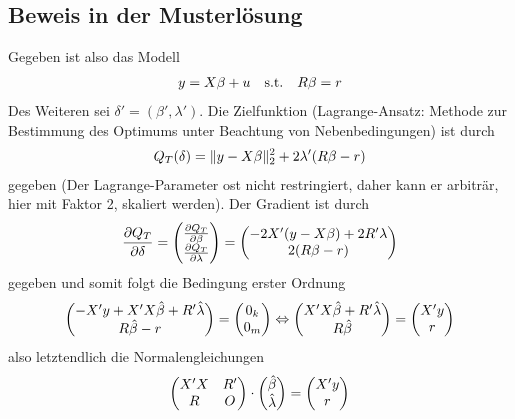 \documentclass{article}
\begin{document}
	\subsection{Beweis in der Musterlösung}
	Gegeben ist also das Modell
	\begin{align}
		y = X\beta + u \quad\text{s.t.}\quad R\beta=r \notag
	\end{align}
	Des Weiteren sei $\delta'=(\beta',\lambda')$. Die Zielfunktion (Lagrange-Ansatz: Methode zur Bestimmung des Optimums unter Beachtung von Nebenbedingungen) ist durch
	\begin{align}
		Q_T(\delta) = \Vert y-X\beta\Vert_2^2 + 2\lambda'(R\beta-r) \notag
	\end{align}
	gegeben (Der Lagrange-Parameter ost nicht restringiert, daher kann er arbiträr, hier mit Faktor 2, skaliert werden). Der Gradient ist durch
	\begin{align}
		\frac{\partial Q_T}{\partial \delta} = \begin{pmatrix}
			\frac{\partial Q_T}{\partial\beta} \\ \frac{\partial Q_T}{\partial\lambda}
		\end{pmatrix} = \begin{pmatrix}
			-2X'(y-X\beta)+2R'\lambda \\ 2(R\beta-r)
		\end{pmatrix} \notag
	\end{align}
	gegeben und somit folgt die Bedingung erster Ordnung
	\begin{align}
		\begin{pmatrix}
			-X'y+X'X\hat{\beta}+R'\hat{\lambda} \\ R\hat{\beta}-r
		\end{pmatrix} = \begin{pmatrix}
			0_k \\ 0_m
		\end{pmatrix} \Leftrightarrow \begin{pmatrix}
			X'X\hat{\beta}+R'\hat{\lambda} \\ R\hat{\beta}
		\end{pmatrix} = \begin{pmatrix}
			X'y \\ r
		\end{pmatrix} \notag
	\end{align}
	also letztendlich die Normalengleichungen
	\begin{align}
		\begin{pmatrix}
			X'X & R' \\ R & O
		\end{pmatrix}\cdot\begin{pmatrix}
			\hat{\beta} \\ \hat{\lambda}
		\end{pmatrix} = \begin{pmatrix}
			X'y \\ r
		\end{pmatrix} \notag
	\end{align}
\end{document}
